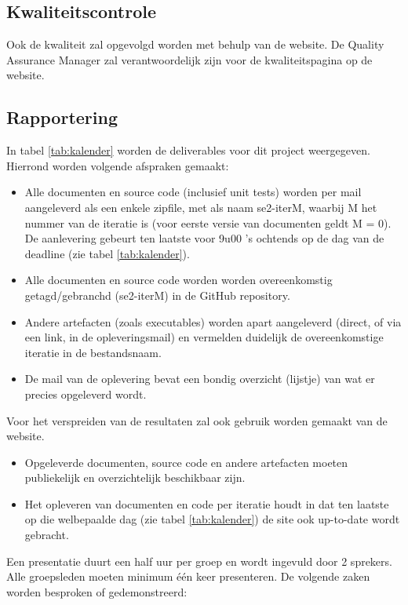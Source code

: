 \subsection{Kwaliteitscontrole}
Ook de kwaliteit zal opgevolgd worden met behulp van de website. De Quality Assurance Manager zal verantwoordelijk zijn voor de kwaliteitspagina op de website.

\subsection{Rapportering} \label{sec:rapportering}
In tabel \ref{tab:kalender} worden de deliverables voor dit project weergegeven. Hierrond worden volgende afspraken gemaakt:
\begin{itemize}
\item Alle documenten en source code (inclusief unit tests) worden per mail aangeleverd als een enkele zipfile, met als naam se2-iterM, waarbij M het nummer van de iteratie is (voor eerste versie van documenten geldt M = 0). De aanlevering gebeurt ten laatste voor 9u00 ’s ochtends op de dag van de deadline (zie tabel \ref{tab:kalender}).
\item Alle documenten en source code worden worden overeenkomstig getagd/gebranchd (se2-iterM) in de GitHub repository.
\item Andere artefacten (zoals executables) worden apart aangeleverd (direct, of via een link, in de opleveringsmail) en vermelden duidelijk de overeenkomstige iteratie in de bestandsnaam.
\item De mail van de oplevering bevat een bondig overzicht (lijstje) van wat er precies opgeleverd
wordt.
\end{itemize}
Voor het verspreiden van de resultaten zal ook gebruik worden gemaakt van de website. 
\begin{itemize}
\item Opgeleverde documenten, source code en andere artefacten moeten publiekelijk en overzichtelijk beschikbaar zijn.
\item Het opleveren van documenten en code per iteratie houdt in dat ten laatste op die welbepaalde dag (zie tabel \ref{tab:kalender}) de site ook up-to-date wordt gebracht.
\end{itemize}
Een presentatie duurt een half uur per groep en wordt ingevuld door 2 sprekers. Alle groepsleden moeten minimum \'{e}\'{e}n keer presenteren. De volgende zaken worden besproken of gedemonstreerd:
